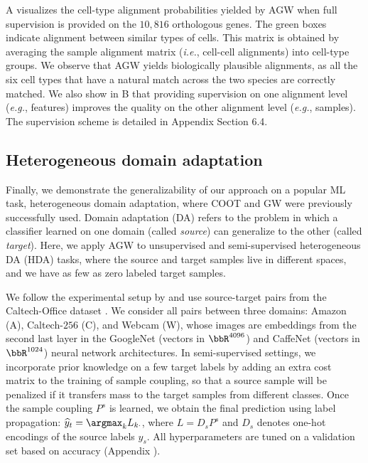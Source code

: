 A visualizes the cell-type alignment probabilities yielded by AGW
when full supervision is provided on the $10,816$ orthologous genes.
The green boxes indicate alignment between similar types of cells.
This matrix is obtained by averaging the sample alignment matrix
(\textit{i.e.}, cell-cell alignments) into cell-type groups. We observe that
AGW yields biologically plausible alignments, as all the six cell types that
have a natural match across the two species are correctly matched.
We also show in B that providing supervision on one alignment level (\textit{e.g.},
features) improves the quality on the other alignment level (\textit{e.g.}, samples).
The supervision scheme is detailed in Appendix Section 6.4.

\subsection{Heterogeneous domain adaptation}
Finally, we demonstrate the generalizability of our approach on a popular ML task,
heterogeneous domain adaptation, where COOT and GW were previously successfully used.
Domain adaptation (DA) refers to the problem in which a classifier learned on one domain
(called \textit{source}) can generalize to the other (called \textit{target}). Here,
we apply AGW to unsupervised and semi-supervised heterogeneous DA (HDA) tasks,
where the source and target samples live in different spaces, and we have as few as
zero labeled target samples.

We follow the experimental setup by \citep{Redko20} and use source-target pairs
from the Caltech-Office dataset \citep{Saenko10}. We consider all pairs between three domains:
Amazon (A), Caltech-$256$ (C), and Webcam (W), whose images are embeddings from
the second last layer in the GoogleNet \citep{Szegedy15} (vectors in $\bbR^{4096}$)
and CaffeNet \citep{Jia14} (vectors in $\bbR^{1024}$) neural network architectures.
In semi-supervised settings, we incorporate prior knowledge on a few target labels
by adding an extra cost matrix to the training of sample coupling, so that
a source sample will be penalized if it transfers mass to the target samples from different classes.
Once the sample coupling $P^s$ is learned, we obtain the final prediction using label propagation:
$\widehat{y}_t = \argmax_k L_{k\cdot}$,
where $L = D_s P^s$ and $D_s$ denotes one-hot encodings of the source labels $y_s$.
All hyperparameters are tuned on a validation set based on accuracy (Appendix ).

